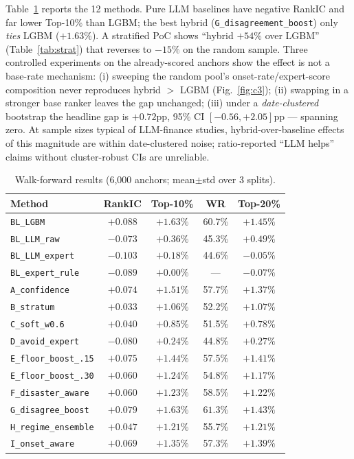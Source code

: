 \documentclass[sigconf,nonacm]{acmart}
\newcommand{\mt}[1]{\texttt{#1}}
\begin{document}
Table~\ref{tab:main} reports the 12 methods. Pure LLM baselines have negative RankIC
and far lower Top-10\% than LGBM; the best hybrid (\mt{G\_disagreement\_boost}) only
\emph{ties} LGBM ($+1.63\%$). A stratified PoC shows ``hybrid $+54\%$ over LGBM''
(Table~\ref{tab:strat}) that reverses to $-15\%$ on the random sample. Three controlled
experiments on the already-scored anchors show the effect is not a base-rate mechanism:
(i) sweeping the random pool's onset-rate/expert-score composition never reproduces
hybrid $>$ LGBM (Fig.~\ref{fig:c3}); (ii) swapping in a stronger base ranker leaves the
gap unchanged; (iii) under a \emph{date-clustered} bootstrap the headline gap is
$+0.72$pp, 95\% CI $[-0.56,+2.05]$pp --- spanning zero. At sample sizes typical of
LLM-finance studies, hybrid-over-baseline effects of this magnitude are within
date-clustered noise; ratio-reported ``LLM helps'' claims without cluster-robust CIs are
unreliable.

\begin{table}[t]
\centering\small
\caption{Walk-forward results (6{,}000 anchors; mean$\pm$std over 3 splits).}
\label{tab:main}
\begin{tabular}{lcccc}
\toprule
Method & RankIC & Top-10\% & WR & Top-20\% \\
\midrule
\mt{BL\_LGBM} & $\mathbf{+0.088}$ & $\mathbf{+1.63\%}$ & 60.7\% & $+1.45\%$ \\
\mt{BL\_LLM\_raw} & $-0.073$ & $+0.36\%$ & 45.3\% & $+0.49\%$ \\
\mt{BL\_LLM\_expert} & $-0.103$ & $+0.18\%$ & 44.6\% & $-0.05\%$ \\
\mt{BL\_expert\_rule} & $-0.089$ & $+0.00\%$ & --- & $-0.07\%$ \\
\mt{A\_confidence} & $+0.074$ & $+1.51\%$ & 57.7\% & $+1.37\%$ \\
\mt{B\_stratum} & $+0.033$ & $+1.06\%$ & 52.2\% & $+1.07\%$ \\
\mt{C\_soft\_w0.6} & $+0.040$ & $+0.85\%$ & 51.5\% & $+0.78\%$ \\
\mt{D\_avoid\_expert} & $-0.080$ & $+0.24\%$ & 44.8\% & $+0.27\%$ \\
\mt{E\_floor\_boost\_.15} & $+0.075$ & $+1.44\%$ & 57.5\% & $+1.41\%$ \\
\mt{E\_floor\_boost\_.30} & $+0.060$ & $+1.24\%$ & 54.8\% & $+1.17\%$ \\
\mt{F\_disaster\_aware} & $+0.060$ & $+1.23\%$ & 58.5\% & $+1.22\%$ \\
\mt{G\_disagree\_boost} & $+0.079$ & $\mathbf{+1.63\%}$ & $\mathbf{61.3\%}$ & $+1.43\%$ \\
\mt{H\_regime\_ensemble} & $+0.047$ & $+1.21\%$ & 55.7\% & $+1.21\%$ \\
\mt{I\_onset\_aware} & $+0.069$ & $+1.35\%$ & 57.3\% & $+1.39\%$ \\
\bottomrule
\end{tabular}
\end{table}
\end{document}
